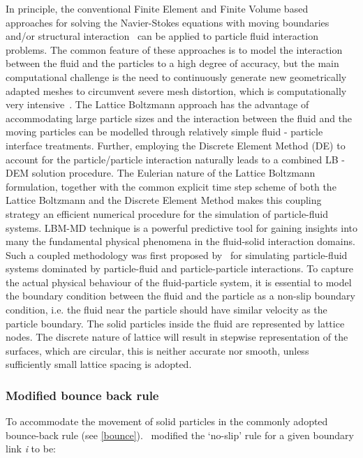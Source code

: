 In principle, the conventional Finite Element and Finite Volume based 
approaches for solving the Navier-Stokes equations with moving boundaries 
and/or structural interaction~\citep{Bathe2004} can be applied to particle 
fluid interaction problems. The common feature of these approaches is to model 
the interaction between the fluid and the particles to a high degree of 
accuracy, but the main computational challenge is the need to continuously 
generate new geometrically adapted meshes to circumvent severe mesh distortion, 
which is computationally very intensive~\citep{Han2007a}. The Lattice Boltzmann 
approach has the advantage of accommodating large particle sizes and the 
interaction between the fluid and the moving particles can be modelled through 
relatively simple fluid - particle interface treatments. Further, employing the 
Discrete Element Method (DE) to account for the particle/particle interaction 
naturally leads to a combined LB - DEM solution procedure. The Eulerian nature 
of the Lattice Boltzmann formulation, together with the common explicit time 
step scheme of both the Lattice Boltzmann and the Discrete Element Method makes 
this 
coupling strategy an efficient numerical procedure for the simulation of 
particle-fluid systems. LBM-MD technique is a powerful predictive tool for 
gaining insights into many the fundamental physical phenomena in the 
fluid-solid interaction domains. Such a coupled methodology was first proposed 
by~\citep{Cook2004} for simulating particle-fluid systems dominated by 
particle-fluid and particle-particle interactions. To capture the actual 
physical behaviour of the fluid-particle system, it is essential to model the 
boundary condition between the fluid and the particle as a non-slip boundary 
condition, i.e. the fluid near the particle should have similar velocity as the 
particle boundary. The solid particles inside the fluid are represented by 
lattice nodes. The discrete nature of lattice will result in stepwise 
representation of the surfaces, which are circular, this is neither accurate 
nor smooth, unless sufficiently small lattice spacing is adopted. 


\subsubsection*{Modified bounce back rule}

To accommodate the movement of solid particles in the commonly adopted 
bounce-back rule (see \cref{bounce}).~\citet{Ladd1994} modified the `no-slip' 
rule for a given boundary link \textit{i} to be:

